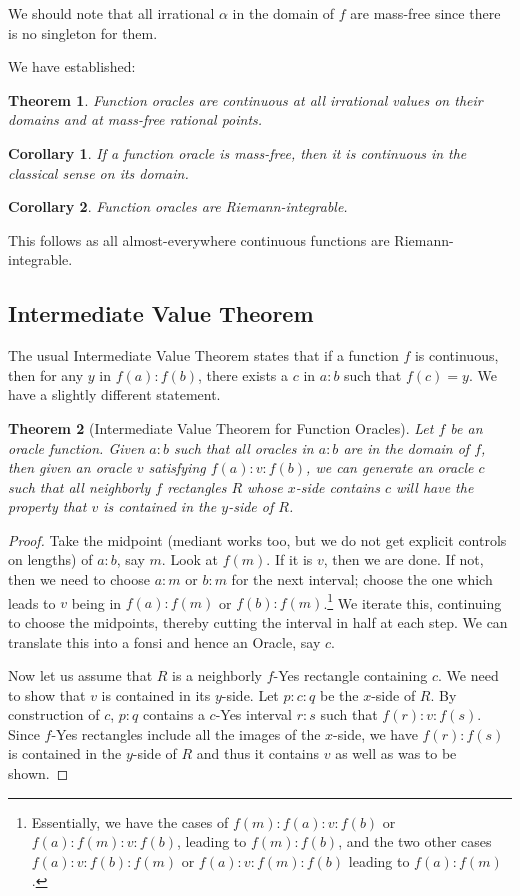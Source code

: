 \documentclass[12pt]{article}
\newtheorem{theorem}{Theorem}
\newtheorem{corollary}{Corollary}
\theoremstyle{remark}
\begin{document}
We should note that all irrational $\alpha$ in the domain of $f$ are mass-free since there is no singleton for them. 

We have established:

\begin{theorem}
    Function oracles are continuous at all irrational values on their domains and at mass-free rational points. 
\end{theorem}

\begin{corollary}
If a function oracle is mass-free, then it is continuous in the classical sense on its domain. 
\end{corollary}

\begin{corollary}
Function oracles are Riemann-integrable. 
\end{corollary}

This follows as all almost-everywhere continuous functions are Riemann-integrable. 

\subsection{Intermediate Value Theorem}

The usual Intermediate Value Theorem states that if a function $f$ is continuous, then for any $y$ in $f(a):f(b)$, there exists a $c$ in $a:b$ such that $f(c) = y$. We have a slightly different statement.

\begin{theorem}[Intermediate Value Theorem for Function Oracles]
Let $f$ be an oracle function. Given $a:b$ such that all oracles in $a:b$ are in the domain of $f$, then given an oracle $v$ satisfying $f(a):v:f(b)$, we can generate an oracle $c$ such that all neighborly $f$ rectangles $R$ whose $x$-side contains $c$ will have the property that $v$ is contained in the $y$-side of $R$.
\end{theorem}

\begin{proof}
Take the midpoint (mediant works too, but we do not get explicit controls on lengths) of $a:b$, say $m$. Look at $f(m)$. If it is $v$, then we are done. If not, then we need to choose $a:m$ or $b:m$ for the next interval; choose the one which leads to $v$ being in $f(a):f(m)$ or $f(b):f(m)$.\footnote{Essentially, we have the cases of $f(m):f(a):v:f(b)$ or $f(a):f(m):v:f(b)$, leading to $f(m):f(b)$, and the two other cases $f(a):v:f(b):f(m)$ or $f(a):v:f(m):f(b)$ leading to $f(a):f(m)$.} We iterate this, continuing to choose the midpoints, thereby cutting the interval in half at each step. We can translate this into a fonsi and hence an Oracle, say $c$. 

Now let us assume that $R$ is a neighborly $f$-Yes rectangle containing $c$. We need to show that $v$ is contained in its $y$-side. Let $p:c:q$ be the $x$-side of $R$. By construction of $c$, $p:q$ contains a $c$-Yes interval $r:s$ such that $f(r):v:f(s)$. Since $f$-Yes rectangles include all the images of the $x$-side, we have $f(r):f(s)$ is contained in the $y$-side of $R$ and thus it contains $v$ as well as was to be shown. 
\end{proof}
\end{document}
